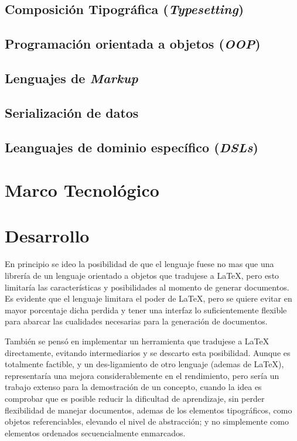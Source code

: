 \documentclass[12pt,letterpaper,titlepage,oneside,openright]{book}
\newcommand{\latex}{\LaTeX\xspace}
\begin{document}
\section{Composición Tipográfica (\textit{Typesetting})}
\section{Programación orientada a objetos (\textit{OOP})}
\section{Lenguajes de \textit{Markup}}
\section{Serialización de datos}
\section{Leanguajes de dominio específico (\textit{DSLs})}

\chapter{Marco Tecnológico}

\chapter{Desarrollo}
En principio se ideo la posibilidad de que el lenguaje fuese no mas que una
librería de un lenguaje orientado a objetos que tradujese a \latex, pero esto
limitaría las características y posibilidades al momento de generar documentos.
Es evidente que el lenguaje limitara el poder de \latex, pero se quiere evitar
en mayor porcentaje dicha perdida y tener una interfaz lo suficientemente
flexible para abarcar las cualidades necesarias para la generación de documentos.

También se pensó en implementar un herramienta que tradujese a \latex
directamente, evitando intermediarios y se descarto esta posibilidad. Aunque es
totalmente factible, y un des-ligamiento de otro lenguaje (ademas de \latex),
representaría una mejora considerablemente en el rendimiento, pero sería un
trabajo extenso para la demostración de un concepto, cuando la idea es comprobar
que es posible reducir la dificultad de aprendizaje, sin perder flexibilidad de
manejar documentos, ademas de los elementos tipográficos, como objetos
referenciables, elevando el nivel de abstracción; y no simplemente como
elementos ordenados secuencialmente enmarcados.
\end{document}
